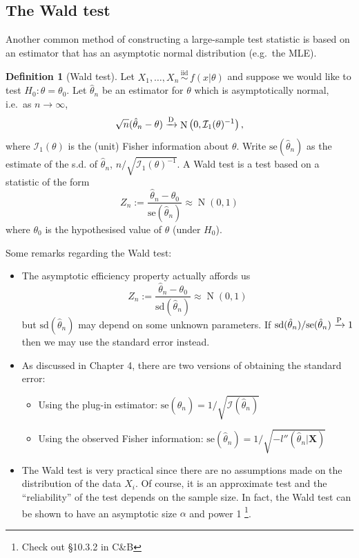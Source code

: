 \documentclass[
]{book}
\newcommand{\bX}{{\boldsymbol X}}
\DeclareMathOperator{\N}{N}
\newcommand{\iid}{\,\overset{\text{iid}}{\sim}\,}
\newcommand{\cI}{{\mathcal I}}
\theoremstyle{definition}
\newtheorem{definition}{Definition}[chapter]
\theoremstyle{definition}
\theoremstyle{definition}
\theoremstyle{definition}
\theoremstyle{remark}
\begin{document}
\hypertarget{the-wald-test}{%
\subsection{The Wald test}\label{the-wald-test}}

Another common method of constructing a large-sample test statistic is based on an estimator that has an asymptotic normal distribution (e.g.~the MLE).

\begin{definition}[Wald test]
Let \(X_1,\dots,X_n \iid f(x|\theta)\) and suppose we would like to test \(H_0:\theta=\theta_0\).
Let \(\hat\theta_n\) be an estimator for \(\theta\) which is asymptotically normal, i.e.~as \(n\to\infty\),
\[
\sqrt n (\hat\theta_n - \theta) \xrightarrow{\text D} \N\left(0,\cI_1(\theta)^{-1}\right),
\]
where \(\cI_1(\theta)\) is the (unit) Fisher information about \(\theta\).
Write \(\text{se}(\hat\theta_n)\) as the estimate of the s.d. of \(\hat\theta_n\), \(n/\sqrt{\cI_1(\theta)^{-1}}\).
A Wald test is a test based on a statistic of the form
\[
Z_n := \frac{\hat\theta_n - \theta_0}{\text{se}(\hat\theta_n)} \approx \N(0,1) 
\]
where \(\theta_0\) is the hypothesised value of \(\theta\) (under \(H_0\)).
\end{definition}

Some remarks regarding the Wald test:

\begin{itemize}
\item
  The asymptotic efficiency property actually affords us
  \[
  Z_n := \frac{\hat\theta_n - \theta_0}{\text{sd}(\hat\theta_n)} \approx \N(0,1) 
  \]
  but \(\text{sd}(\hat\theta_n)\) may depend on some unknown parameters. If \(\text{sd}(\hat\theta_n) / \text{se}(\hat\theta_n) \xrightarrow{\text P} 1\) then we may use the standard error instead.
\item
  As discussed in Chapter 4, there are two versions of obtaining the standard error:

  \begin{itemize}
  \item
    Using the plug-in estimator: \(\text{se}(\hat\theta_n) = 1\Big/\sqrt{\cI(\hat\theta_n)}\)
  \item
    Using the observed Fisher information: \(\text{se}(\hat\theta_n) = 1\Big/\sqrt{-l''(\hat\theta_n|\bX)}\)
  \end{itemize}
\item
  The Wald test is very practical since there are no assumptions made on the distribution of the data \(X_i\). Of course, it is an approximate test and the ``reliability'' of the test depends on the sample size. In fact, the Wald test can be shown to have an asymptotic size \(\alpha\) and power 1
  \footnote{Check out §10.3.2 in C\&B}.
\end{itemize}
\end{document}
